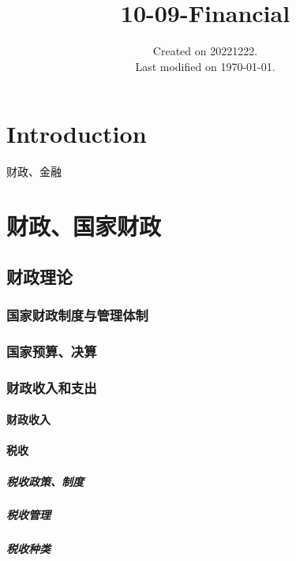 \documentclass[UTF8]{../../RepresentationUniverse}
\begin{document}
\title{10-09-Financial}
\date{Created on 20221222.\\   Last modified on \today.}
\maketitle
\tableofcontents


\chapter{Introduction}



财政、金融
 




\chapter{财政、国家财政}
\section{财政理论}
    \subsection{国家财政制度与管理体制}
    \subsection{国家预算、决算}
    \subsection{财政收入和支出}
        \subsubsection{财政收入}
        \subsubsection{税收}
            \paragraph{税收政策、制度}
            \paragraph{税收管理}
            \paragraph{税收种类}
\end{document}
